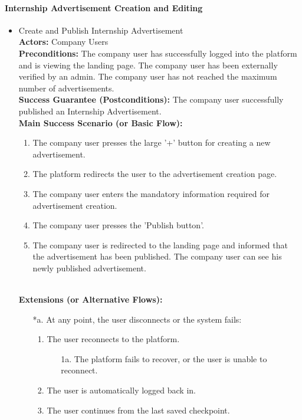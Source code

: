 \newpage
\paragraph{Internship Advertisement Creation and Editing}
\begin{itemize}[label={[\textbf{UC}]}, align=left, leftmargin=*]
     \item {} Create and Publish Internship Advertisement \\
     \textbf{Actors:} Company Users\\
     \textbf{Preconditions:} The company user has successfully logged into the platform and is viewing the landing page. The company user has been externally verified by an admin. The company user has not reached the maximum number of advertisements.\\
     \textbf{Success Guarantee (Postconditions):} The company user successfully published an Internship Advertisement. \\
     \textbf{Main Success Scenario (or Basic Flow):} 
     \begin{enumerate}[label=\arabic*.] 
        \item The company user presses the large '+' button for creating a new advertisement. 
        \item The platform redirects the user to the advertisement creation page.
        \item The company user enters the mandatory information required for advertisement creation.
        \item The company user presses the 'Publish button'.
        \item The company user is redirected to the landing page and informed that the advertisement has been published. The company user can see his newly published advertisement.
     \end{enumerate} \\

    \textbf{Extensions (or Alternative Flows):} 
    \begin{enumerate}[label=\arabic*.]
        \item[*a.] At any point, the user disconnects or the system fails:
            \begin{enumerate}[label=\arabic*.]
                \item The user reconnects to the platform.
                    \begin{enumerate}[label=\alph*.]
                        \item[1a.] The platform fails to recover, or the user is unable to reconnect.
                    \end{enumerate}
                 \item The user is automatically logged back in.
                 \item The user continues from the last saved checkpoint.
            \end{enumerate}
        

\end{enumerate}
\end{itemize}
